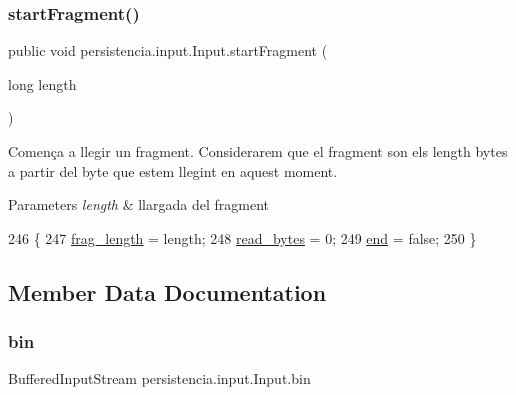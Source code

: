 \subsubsection{\texorpdfstring{start\+Fragment()}{startFragment()}}
{\footnotesize\ttfamily public void persistencia.\+input.\+Input.\+start\+Fragment (\begin{DoxyParamCaption}\item[{long}]{length }\end{DoxyParamCaption})\hspace{0.3cm}{\ttfamily [inline]}}



Comença a llegir un fragment. Considerarem que el fragment son els length bytes a partir del byte que estem llegint en aquest moment. 


\begin{DoxyParams}{Parameters}
{\em length} & llargada del fragment \\
\hline
\end{DoxyParams}

\begin{DoxyCode}
246                                            \{
247         \hyperlink{classpersistencia_1_1input_1_1Input_adae91120899054fe5200d5e307840042}{frag\_length} = length;
248         \hyperlink{classpersistencia_1_1input_1_1Input_ace2c934234f82fb07ae169b50f71cd32}{read\_bytes} = 0;
249         \hyperlink{classpersistencia_1_1input_1_1Input_aa986cd4af0178e1a80f551dcd8936125}{end} = \textcolor{keyword}{false};
250     \}
\end{DoxyCode}


\subsection{Member Data Documentation}
\mbox{\label{classpersistencia_1_1input_1_1Input_aa4b622d30a090256ce05c5082cdb0791}} 
\subsubsection{\texorpdfstring{bin}{bin}}
{\footnotesize\ttfamily Buffered\+Input\+Stream persistencia.\+input.\+Input.\+bin\hspace{0.3cm}{\ttfamily [private]}}


